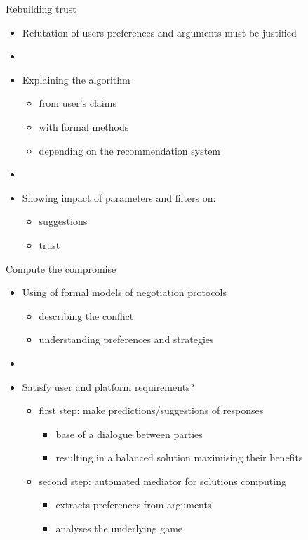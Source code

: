 \documentclass[t,french,mathserif]{beamer}
\begin{document}
\begin{frame}{Rebuilding trust}
	\begin{itemize}
        \item Refutation of users preferences and arguments must be justified
        \item[]
        \item Explaining the algorithm
        \begin{itemize}
            \item from user's claims
            \item with formal methods
            \item depending on the recommendation system
        \end{itemize}
        \item[]
        \item Showing impact of parameters and filters on:
        \begin{itemize}
            \item suggestions
            \item trust
        \end{itemize}
	\end{itemize}
\end{frame}

\begin{frame}{Compute the compromise}
	\begin{itemize}
        \item Using of formal models of negotiation protocols
        \begin{itemize}
            \item describing the conflict
            \item understanding preferences and strategies
        \end{itemize}
        \item[]
        \item Satisfy user and platform requirements?
        \begin{itemize}
            \item first step: make predictions/suggestions of responses
	        \begin{itemize}
                \item base of a dialogue between parties
                \item resulting in a balanced solution maximising their benefits
        	\end{itemize}
            \item second step: automated mediator for solutions computing
        	\begin{itemize}
                \item extracts preferences from arguments
                \item analyses the underlying game
        	\end{itemize}
        \end{itemize}
	\end{itemize}
\end{frame}
\end{document}
